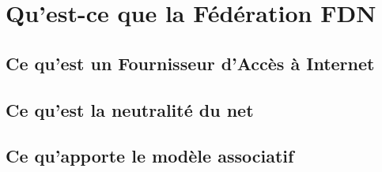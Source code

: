 \section{Qu'est-ce que la Fédération FDN}
\subsection{Ce qu'est un Fournisseur d'Accès à Internet}
\subsection{Ce qu'est la neutralité du net}
\subsection{Ce qu'apporte le modèle associatif}

